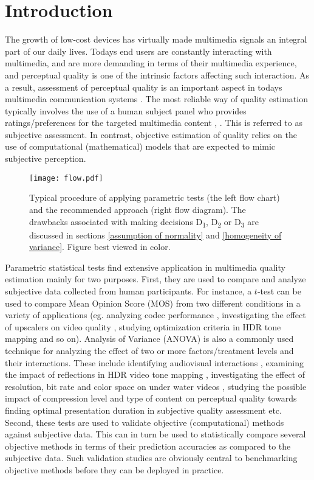\documentclass[10pt,final,Twcolumn]{IEEEtran}
\begin{document}
\section{Introduction}
The growth of low-cost devices has virtually made multimedia signals an integral part of our daily lives. Todays end users are constantly interacting with multimedia, and are more demanding in terms of their multimedia experience, and perceptual quality is one of the intrinsic factors affecting such interaction. As a result, assessment of perceptual quality is an important aspect in todays multimedia communication systems \cite{ITU-SG}. The most reliable way of quality estimation typically involves the use of a human subject panel who provides ratings/preferences for the targeted multimedia content \cite{ITU-SG}, \cite{ITURBS1534}. This is referred to as subjective assessment. In contrast, objective estimation of quality relies on the use of computational (mathematical) models \cite{ITUtutorial} that are expected to mimic subjective perception.   


\begin{figure*}
\centering
{ \texttt{[image: flow.pdf]}}
\caption{Typical procedure of applying parametric tests (the left flow chart) and the recommended approach (right flow diagram). The drawbacks associated with making decisions D\textsubscript{1}, D\textsubscript{2} or D\textsubscript{3} are discussed in sections \ref{assumption of normality} and  \ref{homogeneity of variance}. Figure best viewed in color.}
\label{dectree}
\end{figure*}




Parametric statistical tests find extensive application in multimedia quality estimation mainly for two purposes. First, they are used to compare and analyze subjective data collected from human participants. For instance, a $t$-test can be used to compare Mean Opinion Score (MOS) from two different conditions in a variety of applications (eg. analyzing codec performance \cite{7254155}, investigating the effect of upscalers on video quality \cite{Pitrey}, studying optimization criteria in HDR tone mapping \cite{doi:10.1117/1.OE.52.10.102008} and so on). Analysis of Variance (ANOVA) is also a commonly used technique for analyzing the effect of two or more factors/treatment levels and their interactions. These include identifying audiovisual interactions \cite{belmudez2016audiovisual}, examining the impact of reflections in HDR video tone mapping \cite{Melo2015}, investigating the effect of resolution, bit rate and color space on under water videos \cite{underwaterVQA}, studying the possible impact of compression level and type of content on perceptual quality towards finding optimal presentation duration in subjective quality assessment \cite{optimal_duration} etc. Second, these tests are used to validate objective (computational) methods against subjective data. This can in turn be used to statistically compare several objective methods in terms of their prediction accuracies as compared to the subjective data. Such validation studies are obviously central to benchmarking objective methods before they can be deployed in practice.
\end{document}
